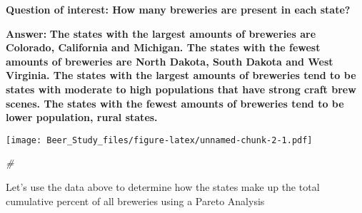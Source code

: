 \documentclass[
]{article}
\newenvironment{Shaded}{\begin{snugshade}}{\end{snugshade}}
\newcommand{\CommentTok}[1]{\textcolor[rgb]{0.56,0.35,0.01}{\textit{#1}}}
\newcommand{\DataTypeTok}[1]{\textcolor[rgb]{0.13,0.29,0.53}{#1}}
\newcommand{\KeywordTok}[1]{\textcolor[rgb]{0.13,0.29,0.53}{\textbf{#1}}}
\newcommand{\NormalTok}[1]{#1}
\newcommand{\OperatorTok}[1]{\textcolor[rgb]{0.81,0.36,0.00}{\textbf{#1}}}
\newcommand{\StringTok}[1]{\textcolor[rgb]{0.31,0.60,0.02}{#1}}
\begin{document}
\textbf{Question of interest: How many breweries are present in each
state?}

\textbf{Answer:} \textbf{The states with the largest amounts of
breweries are Colorado, California and Michigan. The states with the
fewest amounts of breweries are North Dakota, South Dakota and West
Virginia. The states with the largest amounts of breweries tend to be
states with moderate to high populations that have strong craft brew
scenes. The states with the fewest amounts of breweries tend to be lower
population, rural states.}

\begin{Shaded}
\end{Shaded}

\texttt{[image: Beer\_Study\_files/figure-latex/unnamed-chunk-2-1.pdf]}

\begin{Shaded}
\begin{Highlighting}[]
\CommentTok{#}
\end{Highlighting}
\end{Shaded}

Let's use the data above to determine how the states make up the total
cumulative percent of all breweries using a Pareto Analysis
\end{document}
